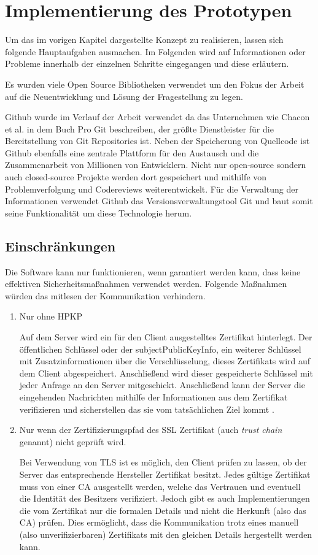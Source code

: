 \chapter{Implementierung des Prototypen}

Um das im vorigen Kapitel dargestellte Konzept zu realisieren, lassen sich folgende Hauptaufgaben ausmachen. Im Folgenden wird auf Informationen oder Probleme innerhalb der einzelnen Schritte eingegangen und diese erläutern.

Es wurden viele Open Source Bibliotheken verwendet um den Fokus der Arbeit auf die Neuentwicklung und Lösung der Fragestellung zu legen.

Github wurde im Verlauf der Arbeit verwendet da das Unternehmen wie Chacon et al. in dem Buch Pro Git \cite{Chacon2014} beschreiben, der größte Dienstleister für die Bereitstellung von Git Repositories ist. Neben der Speicherung von Quellcode ist Github ebenfalls eine zentrale Plattform für den Austausch und die Zusammenarbeit von Millionen von Entwicklern. Nicht nur open-source sondern auch closed-source Projekte werden dort gespeichert und mithilfe von Problemverfolgung und Codereviews weiterentwickelt. Für die Verwaltung der Informationen verwendet Github das Versionsverwaltungstool Git und baut somit seine Funktionalität um diese Technologie herum.

\section{Einschränkungen}
Die Software kann nur funktionieren, wenn garantiert werden kann, dass keine effektiven Sicherheitsmaßnahmen verwendet werden. Folgende Maßnahmen würden das mitlesen der Kommunikation verhindern.
\begin{enumerate}
    \item Nur ohne \ac{HPKP}
    
    Auf dem Server wird ein für den Client ausgestelltes Zertifikat hinterlegt. Der öffentlichen Schlüssel oder der \glqq subjectPublicKeyInfo\grqq{}, ein weiterer Schlüssel mit Zusatzinformationen über die Verschlüsselung, dieses Zertifikats wird auf dem Client abgespeichert. Anschließend wird dieser gespeicherte Schlüssel mit jeder Anfrage an den Server mitgeschickt. Anschließend kann der Server die eingehenden Nachrichten mithilfe der Informationen aus dem Zertifikat verifizieren und sicherstellen das sie vom tatsächlichen Ziel kommt \cite{evans_palmer_sleevi_2015}.
    \item Nur wenn der Zertifizierungspfad des SSL Zertifikat (auch \emph{trust chain} genannt) nicht geprüft wird.
    
    Bei Verwendung von TLS ist es möglich, den Client prüfen zu lassen, ob der Server das entsprechende Hersteller Zertifikat besitzt. Jedes gültige Zertifikat muss von einer \ac{CA} ausgestellt werden, welche das Vertrauen und eventuell die Identität des Besitzers verifiziert. Jedoch gibt es auch Implementierungen die vom Zertifikat nur die formalen Details und nicht die Herkunft (also das \ac{CA}) prüfen.
    Dies ermöglicht, dass die Kommunikation trotz eines manuell (also unverifizierbaren) Zertifikats mit den gleichen Details hergestellt werden kann.
\end{enumerate}


